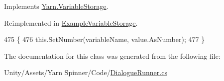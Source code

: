 Implements \hyperlink{a00164_aa90ff61224432c5ed3ce72199c55f440}{Yarn.\-Variable\-Storage}.



Reimplemented in \hyperlink{a00067_ac4265c1c9da485f13a6b05784b0f668d}{Example\-Variable\-Storage}.


\begin{DoxyCode}
475                                                                        \{
476             this.SetNumber(variableName, value.AsNumber);
477         \}
\end{DoxyCode}


The documentation for this class was generated from the following file\-:\begin{DoxyCompactItemize}
\item 
Unity/\-Assets/\-Yarn Spinner/\-Code/\hyperlink{a00250}{Dialogue\-Runner.\-cs}\end{DoxyCompactItemize}
